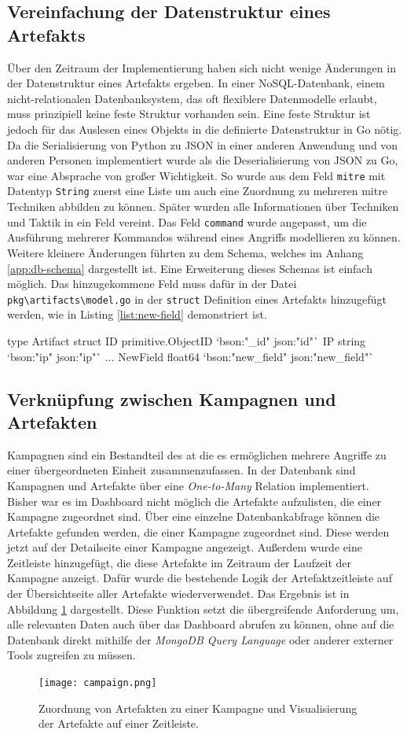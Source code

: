 \subsection{Vereinfachung der Datenstruktur eines Artefakts}
Über den Zeitraum der Implementierung haben sich nicht wenige Änderungen in der Datenstruktur eines Artefakts ergeben. In einer NoSQL-Datenbank, einem nicht-relationalen Datenbanksystem, das oft flexiblere Datenmodelle erlaubt, muss prinzipiell keine feste Struktur vorhanden sein.
Eine feste Struktur ist jedoch für das Auslesen eines Objekts in die definierte Datenstruktur in Go nötig. Da die Serialisierung von Python zu JSON in einer anderen Anwendung und von anderen Personen implementiert wurde als die Deserialisierung von JSON zu Go, war eine Absprache von großer Wichtigkeit. So wurde aus dem Feld \verb|mitre| mit Datentyp \verb|String| zuerst eine Liste um auch eine Zuordnung zu mehreren \gls{mitre} Techniken abbilden zu können. Später wurden alle Informationen über Techniken und Taktik in ein Feld vereint. Das Feld \verb|command| wurde angepasst, um die Ausführung mehrerer Kommandos während eines Angriffs modellieren zu können. Weitere kleinere Änderungen führten zu dem Schema, welches im Anhang \ref{app:db-schema} dargestellt ist. Eine Erweiterung dieses Schemas ist einfach möglich. Das hinzugekommene Feld muss dafür in der Datei \verb|pkg\artifacts\model.go| in der \verb|struct| Definition eines Artefakts hinzugefügt werden, wie in Listing \ref{list:new-field} demonstriert ist.
\begin{code}[caption=Hinzufügen eines Feldes zum Schema in Go, label={list:new-field}]
    type Artifact struct {
            ID          primitive.ObjectID  `bson:"_id" json:"id"`
            IP          string              `bson:"ip" json:"ip"`
            ...
            NewField    float64             `bson:"new_field" json:"new_field"`
        }
\end{code}

\subsection{Verknüpfung zwischen Kampagnen und Artefakten}
Kampagnen sind ein Bestandteil des \gls{at} die es ermöglichen mehrere Angriffe zu einer übergeordneten Einheit zusammenzufassen. In der Datenbank sind Kampagnen und Artefakte über eine \textit{One-to-Many} Relation implementiert. Bisher war es im Dashboard nicht möglich die Artefakte aufzulisten, die einer Kampagne zugeordnet sind. Über eine einzelne Datenbankabfrage können die Artefakte gefunden werden, die einer Kampagne zugeordnet sind. Diese werden jetzt auf der Detailseite einer Kampagne angezeigt. Außerdem wurde eine Zeitleiste hinzugefügt, die diese Artefakte im Zeitraum der Laufzeit der Kampagne anzeigt. Dafür wurde die bestehende Logik der Artefaktzeitleiste auf der Übersichtseite aller Artefakte wiederverwendet. Das Ergebnis ist in Abbildung \ref{fig:campaign} dargestellt. Diese Funktion setzt die übergreifende Anforderung um, alle relevanten Daten auch über das Dashboard abrufen zu können, ohne auf die Datenbank direkt mithilfe der \textit{MongoDB Query Language} oder anderer externer Tools zugreifen zu müssen.

\begin{figure}
    \centering
    \texttt{[image: campaign.png]}
    \caption{Zuordnung von Artefakten zu einer Kampagne und Visualisierung der Artefakte auf einer Zeitleiste.}
    \label{fig:campaign}
\end{figure}